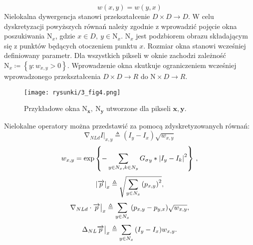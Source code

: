 \documentclass[12pt, twoside, openany]{report}
\theoremstyle{definition}
\begin{document}
\begin{equation}
w(x,y) = w(y,x)
\label{SMARTWEIGHT}
\end{equation}
Nielokalna dywergencja stanowi przekształcenie $D \times D \longrightarrow D$.
W celu dyskretyzacji powyższych równań należy zgodnie z \cite{gilboa2008nonlocal} wprowadzić pojęcie okna poszukiwania ${\mathrm{N}}_x$, gdzie $x\in D,\ y\in {\mathrm{N}}_x$. ${\mathrm{N}}_x$ jest podzbiorem obrazu składającym się z punktów będących otoczeniem punktu $x$. Rozmiar okna stanowi wcześniej definiowany parametr. Dla wszystkich pikseli w oknie zachodzi zależność ${\mathrm{N}}_x\coloneqq \left\{y:w_{x,y}>0\right\}$. Wprowadzenie okna skutkuje ograniczeniem wcześniej wprowadzonego przekształcenia $D \times D\longrightarrow R$ do $\mathrm{N} \times D\longrightarrow R$.
\begin{figure}[!h]
	\centering
	\texttt{[image: rysunki/3\_fig4.png]}
	\caption{Przykładowe okna ${\boldsymbol{\mathrm{N}}}_{\boldsymbol{x}}\boldsymbol{,\ }{\boldsymbol{\mathrm{N}}}_{\boldsymbol{y}}$ utworzone dla pikseli $\boldsymbol{x},\boldsymbol{y}$.}
	\label{3_fig4}
\end{figure}
Nielokalne operatory można przedstawić za pomocą zdyskretyzowanych równań:
\begin{equation}
{\mathrm{\nabla }}_{NLd}I|_{x,y}\triangleq \left(I_y-I_x\right)\sqrt{w_{x,y}}
\label{DNLGRAD}
\end{equation}
\begin{equation}
w_{x,y}={\mathrm{exp} \left\{-\sum_{y\in N_x,k\in N_y \\
}{{G_{\sigma}}_y \ast {\left|I_y-I_k\right|}^2}\right\}\ },
\label{DNLWEIGHT}
\end{equation}
\begin{equation}
{\left|\overrightarrow{p}\right|}_x\triangleq \sqrt{\sum_{y\in N_x \\ 
}{{\left(p_{x,y}\right)}^2}},
\label{DNLMAG}
\end{equation}
\begin{equation}
{\mathrm{\nabla }}_{NLd}\cdot \overrightarrow{p}\big|_x \triangleq \sum_{ 
y\in N_x \\ 
}{\left(p_{x,y}-p_{y,x}\right)}\sqrt{w_{x,y}},
\label{DNLDIV}
\end{equation}
\begin{equation}
{\mathrm{\Delta }}_{NL}{\overrightarrow{p}}\big|_x \triangleq \sum_{
y\in N_x \\ 
}{\left(I_y-I_x\right)}w_{x,y}.
\label{DNLLAP}
\end{equation}
\end{document}
